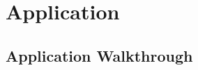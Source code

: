 \section{Application}\label{sec:application}
\subsection{Application Walkthrough}\label{subsec:appwalkthrough}


